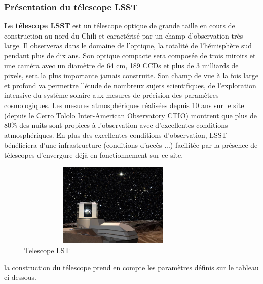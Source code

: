 \subsubsection{Présentation du télescope LSST}
\textbf{Le télescope LSST} est un télescope optique de grande taille en cours de construction au nord du Chili et caractérisé par un champ d’observation très large. Il observeras dans le domaine de l'optique, la totalité de l'hémisphère sud pendant plus de dix ans.
Son optique compacte sera composée de trois miroirs et une caméra avec un diamètre de 64 cm, 189 CCDs et plus de 3 milliards de pixels, sera la plus importante jamais construite. Son champ de vue à la fois large et profond va permettre l'étude de nombreux sujets scientifiques, de l'exploration intensive du système solaire aux mesures de précision des paramètres cosmologiques. 
Les mesures atmosphériques réalisées depuis 10 ans sur le site (depuis le Cerro Tololo Inter-American Observatory CTIO) montrent que plus de 80\% des nuits sont propices à l'observation avec d'excellentes conditions atmosphériques.
\newline En plus des excellentes conditions d'observation, LSST bénéficiera d'une infrastructure (conditions d'accès ...) facilitée par la présence de télescopes d'envergure déjà en fonctionnement sur ce site. 
\newline
\begin{figure}
    \centering
    \includegraphics[height=150,width=350]{report/figures/LSST.jpg}
    \caption{Telescope LST}
    \label{fig:my_label}
\end{figure}
\newline la construction du télescope prend en compte les paramètres définis sur le tableau ci-dessous.
